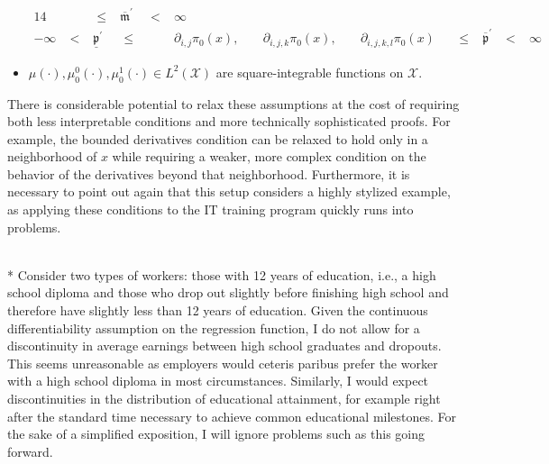 \begin{boxD}
\begin{asm}
\begin{itemize}
\begin{alignat*}{14}
                && \; \leq \; & \overline{\mathfrak{m}}^{\prime} & \; < \; & \infty \\
                -\infty & \; < \; & \underline{\mathfrak{p}}^{\prime} 
                & \; \leq \; && \partial_{i,j} \pi_{0}(x), \; && \partial_{i,j,k} \pi_{0}(x), \; && \partial_{i,j,k,l} \pi_{0}(x)
                && \; \leq \; & \overline{\mathfrak{p}}^{\prime} & \; < \; & \infty
            \end{alignat*}
            \item $\mu(\cdot), \mu_{0}^{0}(\cdot), \mu_{0}^{1}(\cdot) \in L^{2}\left(\mathcal{X}\right)$ are square-integrable functions on $\mathcal{X}$.
		\end{itemize}
	\end{asm}
\end{boxD}
There is considerable potential to relax these assumptions at the cost of requiring both less interpretable conditions and more technically sophisticated proofs. 
For example, the bounded derivatives condition can be relaxed to hold only in a neighborhood of $x$ while requiring a weaker, more complex condition on the behavior of the derivatives beyond that neighborhood.
Furthermore, it is necessary to point out again that this setup considers a highly stylized example, as applying these conditions to the IT training program quickly runs into problems.
\begin{boxE}
    \addtocounter{exmp}{-1}
    \begin{exmp}\mbox{}\\*
        Consider two types of workers: those with 12 years of education, i.e., a high school diploma and those who drop out slightly before finishing high school and therefore have slightly less than 12 years of education.
        Given the continuous differentiability assumption on the regression function, I do not allow for a discontinuity in average earnings between high school graduates and dropouts.
        This seems unreasonable as employers would ceteris paribus prefer the worker with a high school diploma in most circumstances.
        Similarly, I would expect discontinuities in the distribution of educational attainment, for example right after the standard time necessary to achieve common educational milestones.
        For the sake of a simplified exposition, I will ignore problems such as this going forward.
    \end{exmp}    
\end{boxE}
